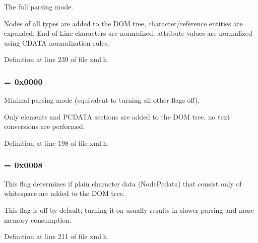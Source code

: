 The full parsing mode. 

Nodes of all types are added to the DOM tree, character/reference entities are expanded, End-\/of-\/Line characters are normalized, attribute values are normalized using CDATA normalization rules. 

Definition at line 239 of file xml.h.

\hypertarget{namespacephys_1_1xml_ab660837afbc6aaab22425d8d23e8f2e4}{
\subsubsection[{ParseMinimal}]{ = 0x0000}}
\label{d9/d27/namespacephys_1_1xml_ab660837afbc6aaab22425d8d23e8f2e4}


Minimal parsing mode (equivalent to turning all other flags off). 

Only elements and PCDATA sections are added to the DOM tree, no text conversions are performed. 

Definition at line 198 of file xml.h.

\hypertarget{namespacephys_1_1xml_a48c0da99d1ed62b1a4984293e64828c6}{
\subsubsection[{ParseWsPcdata}]{ = 0x0008}}
\label{d9/d27/namespacephys_1_1xml_a48c0da99d1ed62b1a4984293e64828c6}


This flag determines if plain character data (NodePcdata) that consist only of whitespace are added to the DOM tree. 

This flag is off by default; turning it on usually results in slower parsing and more memory consumption. 

Definition at line 211 of file xml.h.

